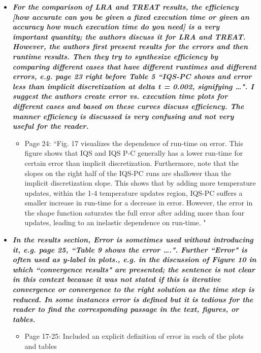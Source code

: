 \documentclass{elsarticle}
\newcommand{\iqspc}{IQS-PC\xspace}
\newcommand{\done}{\checkmark}
\newcommand{\easy}[1]{\textbf{\textit{#1}}}
\newcommand{\medm}[1]{\textbf{\textit{#1}}}
\begin{document}
\begin{itemize}
\item[\done] \medm{ For the comparison of LRA and TREAT results, the efficiency [how accurate can you be given a fixed execution time or given an accuracy how much execution time do you need] is a very important quantity; the authors discuss it for LRA and TREAT. However, the authors first present results for the errors and then runtime results. Then they try to synthesize efficiency by comparing different cases that have different runtimes and different errors, e.g. page 23 right before Table 5 ``IQS-PC shows and error less than implicit discretization at delta t = 0.002, signifying …". I suggest the authors create error vs. execution time plots for different cases and based on these curves discuss efficiency. The manner efficiency is discussed is very confusing and not very useful for the reader. }
\begin{itemize}
\item Page 24: ``Fig. 17 visualizes the dependence of run-time on error. This figure shows that IQS and IQS P-C generally has a lower run-time for certain error than implicit discretization. Furthermore, note that the slopes on the right half of the \iqspc runs are shallower than the implicit discretization slope. This shows that by adding more temperature updates, within the 1-4 temperature updates region, \iqspc suffers a smaller increase in run-time for a decrease in error. However, the error in the shape function saturates the full error after adding more than four updates, leading to an inelastic dependence on run-time. "
\end{itemize}


\item[\done] \easy{ In the results section, Error is sometimes used without introducing it, e.g. page 25, ``Table 9 shows the error ….". Further ``Error" is often used as y-label in plots., e.g. in the discussion of Figure 10 in which ``convergence results" are presented; the sentence is not clear in this context because it was not stated if this is iterative convergence or convergence to the right solution as the time step is reduced. In some instances error is defined but it is tedious for the reader to find the corresponding passage in the text, figures, or tables. }
\begin{itemize}
\item Page 17-25: Included an explicit definition of error in each of the plots and tables
\end{itemize}


\end{itemize}
\end{document}

